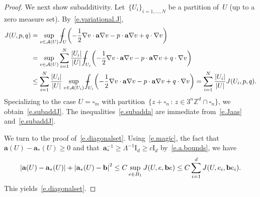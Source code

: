 \documentclass[11pt]{article} %
\let\oldsquare\square %
\renewcommand{\square}{\oldsquare}
\numberwithin{equation}{section}
\theoremstyle{definition}
\let\originalleft\left
\let\originalright\right
\renewcommand{\left}{\mathopen{}\mathclose\bgroup\originalleft}
\renewcommand{\right}{\aftergroup\egroup\originalright}
\newcommand*{\Id}{\ensuremath{\mathrm{I}_d}}
\newcommand*{\Zd}{\ensuremath{\mathbb{Z}^d}}
\renewcommand{\b}{\ensuremath{\mathbf{b}}}
\renewcommand{\a}{\mathbf{a}}
\newcommand{\cu}{\square}
\def\Xint#1{\mathchoice
{\XXint\displaystyle\textstyle{#1}}%
{\XXint\textstyle\scriptstyle{#1}}%
{\XXint\scriptstyle\scriptscriptstyle{#1}}%
{\XXint\scriptscriptstyle\scriptscriptstyle{#1}}%
\!\int}
\def\XXint#1#2#3{{\setbox0=\hbox{$#1{#2#3}{\int}$}
\vcenter{\hbox{$#2#3$}}\kern-.5\wd0}}
\def\fint{\Xint-}
\begin{document}
\begin{proof}
We next show subadditivity. 
Let~$\{ U_i \}_{i=1,\ldots,N}$ be a partition of~$U$ (up to a zero measure set). By~\eqref{e.variational.J}, 
\begin{align*}
J(U,p,q) & 
= 
\sup_{v\in \mathcal{A}(U)} 
\fint_U \left( -\frac12 \nabla v\cdot \a\nabla v -p\cdot \a\nabla v + q\cdot \nabla v   \right)
\\ & 
=
\sup_{v\in \mathcal{A}(U)} 
\sum_{i=1}^N
\frac{|U_i|}{|U|}
\fint_{U_i} \left( -\frac12 \nabla v\cdot \a\nabla v -p\cdot \a\nabla v + q\cdot \nabla v   \right)
\\ & 
\leq
\sum_{i=1}^N
\frac{|U_i|}{|U|}
\sup_{v\in \mathcal{A}(U_i)} 
\fint_{U_i} \left( -\frac12 \nabla v\cdot \a\nabla v -p\cdot \a\nabla v + q\cdot \nabla v   \right)
=
\sum_{i=1}^N
\frac{|U_i|}{|U|}
J(U_i,p,q). 
\end{align*}
Specializing to the case $U = \cu_m$ with partition~$\{ z+\cu_n \,:\, z\in 3^n\Zd \cap \cu_n \}$, we obtain~\eqref{e.subaddJ}. The inequalities~\eqref{e.subadda} are immediate from~\eqref{e.Jaas} and~\eqref{e.subaddJ}. 

\smallskip

We turn to the proof of~\eqref{e.diagonalset}.
Using~\eqref{e.magic}, the fact that~$\a (U)- \a_*(U) \geq 0$ and that~$\a^{-1}_* \geq \Lambda^{-1}  \Id \geq c \Id$ by~\eqref{e.a.bounds}, we have 
\begin{equation*}
\left| \a(U) - \a_*(U) \right|
+ \left| \a_*(U) - \b \right|^2
\leq
C\sup_{e \in B_1} 
J(U,e,\b e) 
\leq 
C \sum_{i=1}^d 
J(U,e_i,\b e_i). 
\end{equation*}
This yields~\eqref{e.diagonalset}.

\smallskip


\end{proof}
\end{document}
